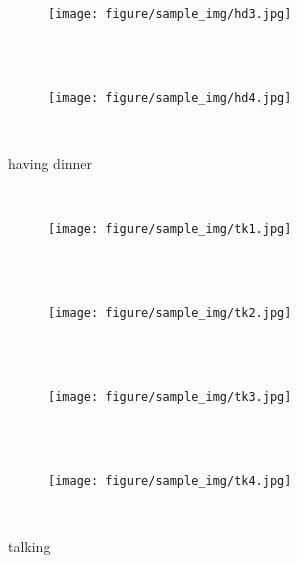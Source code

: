 \begin{figure*}[t]
\begin{subfigure}[b]{0.20\textwidth}
    \begin{subfigure}[b]{0.23\textwidth}
      \centering
      \centerline{\texttt{[image: figure/sample\_img/hd3.jpg]}}
    \end{subfigure} \\
    ~\vspace{-3.0mm}\\
    \begin{subfigure}[b]{0.23\textwidth}
      \centering
      \centerline{\texttt{[image: figure/sample\_img/hd4.jpg]}}
    \end{subfigure} \\
    \caption{having dinner}
  \end{subfigure}
  ~\hspace{-3mm}
  \begin{subfigure}[b]{0.20\textwidth}
    \centering
    \begin{subfigure}[b]{0.23\textwidth}
      \centering
      \centerline{\texttt{[image: figure/sample\_img/tk1.jpg]}}
    \end{subfigure} \\
    ~\vspace{-3.0mm}\\
    \begin{subfigure}[b]{0.23\textwidth}
      \centering
      \centerline{\texttt{[image: figure/sample\_img/tk2.jpg]}}
    \end{subfigure} \\
    ~\vspace{-3.0mm}\\
    \begin{subfigure}[b]{0.23\textwidth}
      \centering
      \centerline{\texttt{[image: figure/sample\_img/tk3.jpg]}}
    \end{subfigure} \\
    ~\vspace{-3.0mm}\\
    \begin{subfigure}[b]{0.23\textwidth}
      \centering
      \centerline{\texttt{[image: figure/sample\_img/tk4.jpg]}}
    \end{subfigure} \\
    \caption{talking}
  \end{subfigure}
  ~\hspace{-3mm}
  \begin{subfigure}[b]{0.20\textwidth}
    \centering
    \begin{subfigure}[b]{0.23\textwidth}

\end{subfigure}
\end{subfigure}
\end{figure*}
